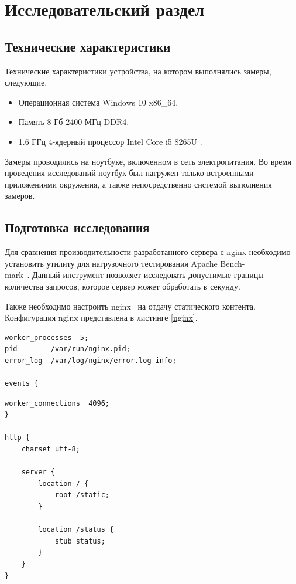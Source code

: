 \section{Исследовательский раздел}

\subsection{Технические характеристики}

Технические характеристики устройства, на котором выполнялись замеры, следующие.

\begin{itemize}[label=---]
	\item Операционная система Windows 10 \cite{oswind} x86\_64.
	\item Память 8 Гб 2400 МГц DDR4.
	\item 1.6 ГГц 4-ядерный процессор Intel Core i5 8265U \cite{intel}.
\end{itemize}

Замеры проводились на ноутбуке, включенном в сеть электропитания. Во время проведения исследований ноутбук был нагружен только встроенными приложениями окружения, а также непосредственно системой выполнения замеров.

\subsection{Подготовка исследования}

Для сравнения производительности разработанного сервера с nginx необходимо установить утилиту для нагрузочного тестирования Apache Bench-\\mark~\cite{ab}. Данный инструмент позволяет исследовать допустимые границы количества запросов, которое сервер может обработать в секунду.

Также необходимо настроить nginx~\cite{nginx} на отдачу статического контента. Конфигурация nginx представлена в листинге \ref{nginx}.

\begin{lstlisting}[caption={Конфигурация nginx}, label=nginx]
worker_processes  5;
pid        /var/run/nginx.pid;
error_log  /var/log/nginx/error.log info;

events {
\end{lstlisting}

\begin{lstlisting}[title={Продолжение листинга \ref{nginx}}, label=nginx1, firstnumber=6]
	worker_connections  4096; 
}

http {
	charset utf-8;
	
	server { 
		location / {
			root /static;
		}
		
		location /status {
			stub_status;
		}
	}
}
\end{lstlisting}

